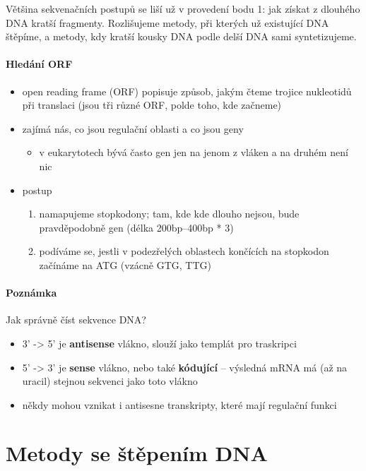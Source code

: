 \documentclass[DIV=8]{scrreprt}
\newcommand{\mybox}[2]{
    \paragraph{#1} #2
}
\begin{document}
Většina sekvenačních postupů se liší už v provedení bodu 1: jak získat z dlouhého DNA kratší fragmenty. Rozlišujeme metody, při kterých už existující DNA štěpíme, a metody, kdy kratší kousky DNA  podle delší DNA sami syntetizujeme.

\paragraph{Hledání ORF}
\begin{itemize}[nosep]
    \item open reading frame (ORF) popisuje způsob, jakým čteme trojice nukleotidů při translaci (jsou tři různé ORF, polde toho, kde začneme)
    \item zajímá nás, co jsou regulační oblasti a co jsou geny
\begin{itemize}[nosep]
    \item v eukarytotech bývá často gen jen na jenom z vláken a na druhém není nic
\end{itemize}

    \item postup
\begin{enumerate}[nosep]
    \item namapujeme stopkodony; tam, kde kde dlouho nejsou, bude pravděpodobně gen (délka 200bp--400bp * 3)
    \item podíváme se, jestli v podezřelých oblastech končících na stopkodon začínáme na ATG (vzácně GTG, TTG)
\end{enumerate}

\end{itemize}



\mybox{Poznámka}{Jak správně číst sekvence DNA?
\begin{itemize}[nosep]
    \item 3' -> 5' je \textbf{antisense} vlákno, slouží jako templát pro traskripci
    \item 5' -> 3' je \textbf{sense} vlákno, nebo také \textbf{kódující} -- výsledná mRNA má (až na uracil) stejnou sekvenci jako toto vlákno
    \item někdy mohou vznikat i antisesne transkripty, které mají regulační funkci
\end{itemize}

}


\section{Metody se štěpením DNA} \label{Metody se štěpením DNA}
\end{document}
